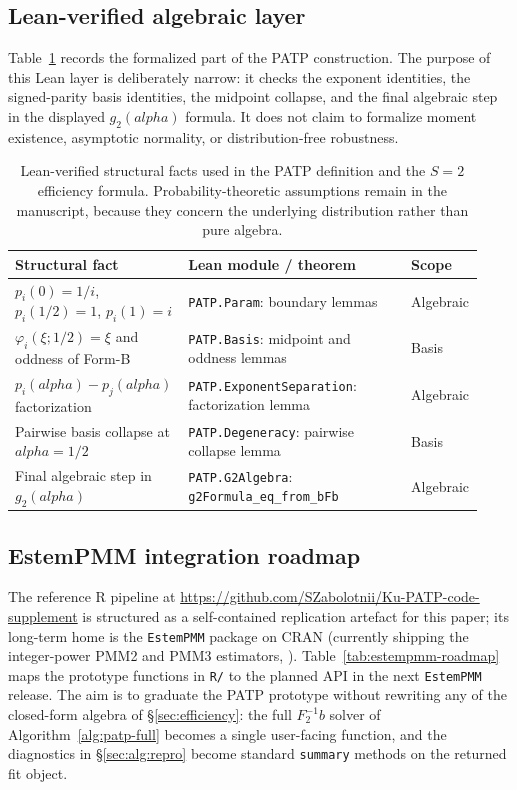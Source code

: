 \documentclass[11pt]{article}
\def\alpha{alpha}%
\def\mathbf#1{#1}%
\theoremstyle{definition}
\begin{document}
\subsection{Lean-verified algebraic layer}\label{app:lean-facts}

Table~\ref{tab:lean-structural} records the formalized part of the PATP
construction.  The purpose of this Lean layer is deliberately narrow: it
checks the exponent identities, the signed-parity basis identities, the
midpoint collapse, and the final algebraic step in the displayed
$g_2(\alpha)$ formula.  It does not claim to formalize moment existence,
asymptotic normality, or distribution-free robustness.

\begin{table}[!htb]
\centering
\small
\setlength{\tabcolsep}{3pt}
\begin{tabular}{p{0.34\linewidth}p{0.47\linewidth}p{0.12\linewidth}}
\hline
Structural fact & Lean module / theorem & Scope \\
\hline
$p_i(0)=1/i$, $p_i(1/2)=1$, $p_i(1)=i$
  & \texttt{PATP.Param}: boundary lemmas
  & Algebraic \\
$\varphi_i(\xi;1/2)=\xi$ and oddness of Form-B
  & \texttt{PATP.Basis}: midpoint and oddness lemmas
  & Basis \\
$p_i(\alpha)-p_j(\alpha)$ factorization
  & \texttt{PATP.ExponentSeparation}: factorization lemma
  & Algebraic \\
Pairwise basis collapse at $\alpha=1/2$
  & \texttt{PATP.Degeneracy}: pairwise collapse lemma
  & Basis \\
Final algebraic step in $g_2(\alpha)$
  & \texttt{PATP.G2Algebra}: \texttt{g2Formula\_eq\_from\_bFb}
  & Algebraic \\
\hline
\end{tabular}
\caption{Lean-verified structural facts used in the PATP definition and
the $S=2$ efficiency formula.  Probability-theoretic assumptions remain in
the manuscript, because they concern the underlying distribution rather than
pure algebra.}
\label{tab:lean-structural}
\end{table}

\subsection{EstemPMM integration roadmap}\label{app:estempmm-roadmap}

The reference R pipeline at
\url{https://github.com/SZabolotnii/Ku-PATP-code-supplement}
is structured as a self-contained replication artefact for this paper;
its long-term home is the \texttt{EstemPMM} package on CRAN
(currently shipping the integer-power PMM2 and PMM3 estimators,
\citealp{zabolotnii2026estempmmcran}). Table~\ref{tab:estempmm-roadmap}
maps the prototype functions in \texttt{R/} to the planned API in the
next \texttt{EstemPMM} release. The aim is to graduate the PATP
prototype without rewriting any of the closed-form algebra of
\S\ref{sec:efficiency}: the full $\mathbf{F}_2^{-1}\mathbf{b}$ solver of
Algorithm~\ref{alg:patp-full} becomes a single user-facing function, and
the diagnostics in \S\ref{sec:alg:repro} become standard \texttt{summary}
methods on the returned fit object.
\end{document}
